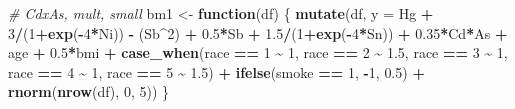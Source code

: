 \documentclass[12pt, twoside]{amherstthesis}
\newenvironment{Shaded}{\begin{snugshade}}{\end{snugshade}}
\newcommand{\AttributeTok}[1]{\textcolor[rgb]{0.13,0.29,0.53}{#1}}
\newcommand{\CommentTok}[1]{\textcolor[rgb]{0.56,0.35,0.01}{\textit{#1}}}
\newcommand{\ControlFlowTok}[1]{\textcolor[rgb]{0.13,0.29,0.53}{\textbf{#1}}}
\newcommand{\DecValTok}[1]{\textcolor[rgb]{0.00,0.00,0.81}{#1}}
\newcommand{\FloatTok}[1]{\textcolor[rgb]{0.00,0.00,0.81}{#1}}
\newcommand{\FunctionTok}[1]{\textcolor[rgb]{0.13,0.29,0.53}{\textbf{#1}}}
\newcommand{\NormalTok}[1]{#1}
\newcommand{\OtherTok}[1]{\textcolor[rgb]{0.56,0.35,0.01}{#1}}
\newcommand{\SpecialCharTok}[1]{\textcolor[rgb]{0.81,0.36,0.00}{\textbf{#1}}}
\begin{document}
\begin{Shaded}
\begin{Highlighting}[]
\CommentTok{\# CdxAs, mult, small}
\NormalTok{bm1 }\OtherTok{\textless{}{-}} \ControlFlowTok{function}\NormalTok{(df) \{}
  \FunctionTok{mutate}\NormalTok{(df, }\AttributeTok{y =} 
\NormalTok{           Hg }\SpecialCharTok{+} \DecValTok{3}\SpecialCharTok{/}\NormalTok{(}\DecValTok{1}\SpecialCharTok{+}\FunctionTok{exp}\NormalTok{(}\SpecialCharTok{{-}}\DecValTok{4}\SpecialCharTok{*}\NormalTok{Ni)) }\SpecialCharTok{{-}}\NormalTok{ (Sb}\SpecialCharTok{\^{}}\DecValTok{2}\NormalTok{) }\SpecialCharTok{+} \FloatTok{0.5}\SpecialCharTok{*}\NormalTok{Sb }\SpecialCharTok{+} \FloatTok{1.5}\SpecialCharTok{/}\NormalTok{(}\DecValTok{1}\SpecialCharTok{+}\FunctionTok{exp}\NormalTok{(}\SpecialCharTok{{-}}\DecValTok{4}\SpecialCharTok{*}\NormalTok{Sn)) }\SpecialCharTok{+} 
           \FloatTok{0.35}\SpecialCharTok{*}\NormalTok{Cd}\SpecialCharTok{*}\NormalTok{As }\SpecialCharTok{+} 
\NormalTok{           age }\SpecialCharTok{+} \FloatTok{0.5}\SpecialCharTok{*}\NormalTok{bmi }\SpecialCharTok{+} 
           \FunctionTok{case\_when}\NormalTok{(race }\SpecialCharTok{==} \DecValTok{1} \SpecialCharTok{\textasciitilde{}} \DecValTok{1}\NormalTok{, }
\NormalTok{                     race }\SpecialCharTok{==} \DecValTok{2} \SpecialCharTok{\textasciitilde{}} \FloatTok{1.5}\NormalTok{, }
\NormalTok{                     race }\SpecialCharTok{==} \DecValTok{3} \SpecialCharTok{\textasciitilde{}} \DecValTok{1}\NormalTok{, }
\NormalTok{                     race }\SpecialCharTok{==} \DecValTok{4} \SpecialCharTok{\textasciitilde{}} \DecValTok{1}\NormalTok{, }
\NormalTok{                     race }\SpecialCharTok{==} \DecValTok{5} \SpecialCharTok{\textasciitilde{}} \FloatTok{1.5}\NormalTok{) }\SpecialCharTok{+}
           \FunctionTok{ifelse}\NormalTok{(smoke }\SpecialCharTok{==} \DecValTok{1}\NormalTok{, }\SpecialCharTok{{-}}\DecValTok{1}\NormalTok{, }\FloatTok{0.5}\NormalTok{) }\SpecialCharTok{+}
           \FunctionTok{rnorm}\NormalTok{(}\FunctionTok{nrow}\NormalTok{(df), }\DecValTok{0}\NormalTok{, }\DecValTok{5}\NormalTok{))}
\NormalTok{\}}


\end{Highlighting}
\end{Shaded}
\end{document}
